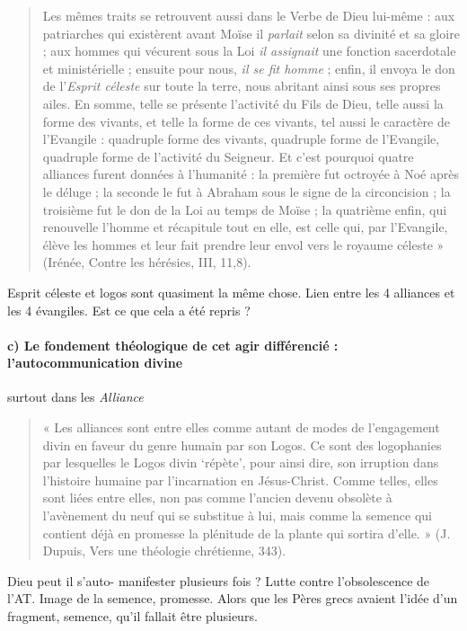 \begin{quote}
    Les mêmes traits se retrouvent aussi dans le Verbe de Dieu lui-même : aux patriarches qui existèrent
avant Moïse il \textit{parlait} selon sa divinité et sa gloire ; aux hommes qui vécurent sous la Loi \textit{il assignait}
une fonction sacerdotale et ministérielle ; ensuite pour nous, \textit{il se fit homme }; enfin, il envoya le don de
l’\textit{Esprit céleste} sur toute la terre, nous abritant ainsi sous ses propres ailes. En somme, telle se présente
l’activité du Fils de Dieu, telle aussi la forme des vivants, et telle la forme de ces vivants, tel aussi le
caractère de l’Evangile : quadruple forme des vivants, quadruple forme de l’Evangile, quadruple
forme de l’activité du Seigneur. Et c’est pourquoi quatre alliances furent données à l’humanité : la
première fut octroyée à Noé après le déluge ; la seconde le fut à Abraham sous le signe de la
circoncision ; la troisième fut le don de la Loi au temps de Moïse ; la quatrième enfin, qui renouvelle
l’homme et récapitule tout en elle, est celle qui, par l’Evangile, élève les hommes et leur fait prendre
leur envol vers le royaume céleste » (Irénée, Contre les hérésies, III, 11,8).
\end{quote}
Esprit céleste et logos sont quasiment la même chose.
Lien entre les 4 alliances et les 4 évangiles. Est ce que cela a été repris ?


\paragraph{c) Le fondement théologique de cet agir différencié : l’autocommunication divine} surtout dans les \textit{Alliance}

\begin{quote}
    « Les alliances sont entre elles comme autant de modes de l’engagement divin en faveur du genre
humain par son Logos. Ce sont des logophanies par lesquelles le Logos divin ‘répète’, pour ainsi dire,
son irruption dans l’histoire humaine par l’incarnation en Jésus-Christ. Comme telles, elles sont liées
entre elles, non pas comme l’ancien devenu obsolète à l’avènement du neuf qui se substitue à lui, mais
comme la semence qui contient déjà en promesse la plénitude de la plante qui sortira d’elle. » (J.
Dupuis, Vers une théologie chrétienne, 343).
\end{quote}
Dieu peut il s'auto- manifester plusieurs fois ? 
Lutte contre l'obsolescence de l'AT. Image de la semence, promesse. Alors que les Pères grecs avaient l'idée d'un fragment, semence, qu'il fallait être plusieurs. 

